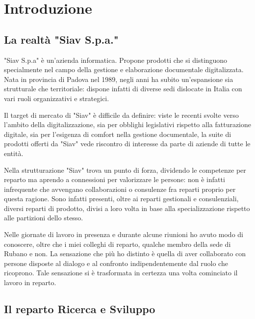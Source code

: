 
\chapter{Introduzione}
\label{cap:introduzione}
\section{La realtà "Siav S.p.a."}
\label{sec:realtaSiav}
"Siav S.p.a" è un'azienda informatica. Propone prodotti che si distinguono specialmente nel campo della gestione e elaborazione documentale digitalizzata. Nata in provincia di Padova nel 1989, negli anni ha subito un'espansione sia strutturale che territoriale: dispone infatti di diverse sedi dislocate in Italia con vari ruoli organizzativi e strategici.

Il target di mercato di "Siav" è difficile da definire: viste le recenti svolte verso l'ambito della digitalizzazione, sia per obblighi legislativi rispetto alla fatturazione digitale, sia per l'esigenza di comfort nella gestione documentale, la suite di prodotti offerti da "Siav" vede riscontro di interesse da parte di aziende di tutte le entità.

Nella strutturazione "Siav" trova un punto di forza, dividendo le competenze per reparto ma aprendo a connessioni per valorizzare le persone: non è infatti infrequente che avvengano collaborazioni o consulenze fra reparti proprio per questa ragione. Sono infatti presenti, oltre ai reparti gestionali e consulenziali, diversi reparti di prodotto, divisi a loro volta in base alla specializzazione rispetto alle partizioni dello stesso.

Nelle giornate di lavoro in presenza e durante alcune riunioni ho avuto modo di conoscere, oltre che i miei colleghi di reparto, qualche membro della sede di Rubano e non. La sensazione che più ho distinto è quella di aver collaborato con persone disposte al dialogo e al confronto indipendentemente dal ruolo che ricoprono. Tale sensazione si è trasformata in certezza una volta cominciato il lavoro in reparto.


\section{Il reparto Ricerca e Sviluppo}
